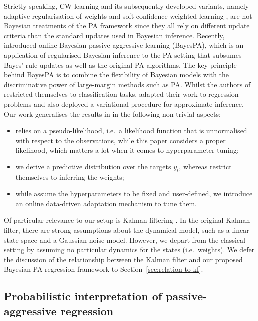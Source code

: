 Strictly speaking, CW learning and its subsequently developed variants, namely adaptive regularisation of weights \citep{arow} and soft-confidence weighted learning \citep{scw1, scw2}, are not Bayesian treatments of the PA framework since they all rely on different update criteria than the standard updates used in Bayesian inference. Recently, \citet{bayespa-old, bayespa} introduced online Bayesian passive-aggressive learning (BayesPA), which is an application of regularised Bayesian inference to the PA setting that subsumes Bayes' rule updates as well as the original PA algorithms. The key principle behind BayesPA is to combine the flexibility of Bayesian models with the discriminative power of large-margin methods such as PA. Whilst the authors of \citep{bayespa-old, bayespa} restricted themselves to classification tasks, \citet{deng16} adapted their work to regression problems and also deployed a variational procedure for approximate inference. Our work generalises the results in \citep{deng16} in the following non-trivial aspects:
\begin{itemize}
	\item \citep{deng16} relies on a pseudo-likelihood, i.e.\ a likelihood function that is unnormalised with respect to the observations, while this paper considers a proper likelihood, which matters a lot when it comes to hyperparameter tuning;
	\item we derive a predictive distribution over the targets $y_t$, whereas \citet{deng16} restrict themselves to inferring the weights;
	\item while \citet{deng16} assume the hyperparameters to be fixed and user-defined, we introduce an online data-driven adaptation mechanism to tune them.
\end{itemize}

Of particular relevance to our setup is Kalman filtering \citep{kalman}. In the original Kalman filter, there are strong assumptions about the dynamical model, such as a linear state-space and a Gaussian noise model. However, we depart from the classical setting by assuming no particular dynamics for the states (i.e.\ weights). We defer the discussion of the relationship between the Kalman filter and our proposed Bayesian PA regression framework to Section~\ref{sec:relation-to-kf}.

\subsection{Probabilistic interpretation of passive-aggressive regression}

